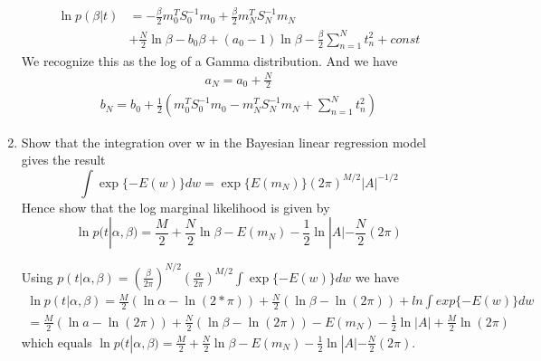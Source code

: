 \documentclass[a4paper]{article}
\begin{document}
\begin{enumerate}
\begin{solution}
			\begin{equation*}
				\begin{aligned}
				\ln p(\beta|t)
				&=-\frac{\beta}{2}m_0^TS_0^{-1}m_0+\frac{\beta}{2}m_N^TS_N^{-1}m_N\\
				&+\frac{N}{2}\ln \beta - b_0 \beta + (a_0 - 1)\ln \beta - \frac{\beta}{2}\sum_{n=1}^{N}t_n^2+const
				\end{aligned}
			\end{equation*}
			We recognize this as the log of a Gamma distribution. And we have
			\begin{equation*}
				\begin{aligned}
				a_N=a_0+\frac{N}{2}
				\end{aligned}
			\end{equation*}
			\begin{equation*}
				\begin{aligned}
					b_N=b_0+\frac{1}{2}(m_0^TS_0^{-1}m_0-m_N^TS_N^{-1}m_N+\sum_{n=1}^{N}t_n^2)
				\end{aligned}
			\end{equation*}
		\end{solution}
		\item
		Show that the integration over w in the Bayesian linear regression model gives the result
		\begin{equation*}
			\int \exp\{-E(w)\}dw=\exp\{E(m_N)\}(2\pi)^{M/2}|A|^{-1/2}
		\end{equation*}
		Hence show that the log marginal likelihood is given by
		\begin{equation*}
			\ln p(t|\alpha,\beta)=\frac{M}{2}+\frac{N}{2}\ln\beta - E(m_N)-\frac{1}{2}\ln|A|-\frac{N}{2}(2\pi)
		\end{equation*}
		\begin{solution}
			Using $p(t|\alpha,\beta)=(\frac{\beta}{2\pi})^{N/2}(\frac{\alpha}{2\pi})^{M/2}\int\exp\{-E(w)\}dw$
			we have
			\begin{equation*}
				\begin{aligned}
				\ln p(t|\alpha,\beta)=\frac{M}{2}(\ln \alpha - \ln(2*\pi))+\frac{N}{2}(\ln \beta - \ln (2\pi))+ln \int exp\{-E(w)\}dw\\
				=\frac{M}{2}(\ln a-\ln(2\pi))+\frac{N}{2}(\ln \beta - \ln(2\pi))-E(m_N)-\frac{1}{2}\ln |A|+\frac{M}{2}\ln (2\pi)
				\end{aligned}
			\end{equation*}
			which equals $
			\ln p(t|\alpha,\beta)=\frac{M}{2}+\frac{N}{2}\ln\beta - E(m_N)-\frac{1}{2}\ln|A|-\frac{N}{2}(2\pi)$.
		\end{solution}

\end{enumerate}
\end{document}
